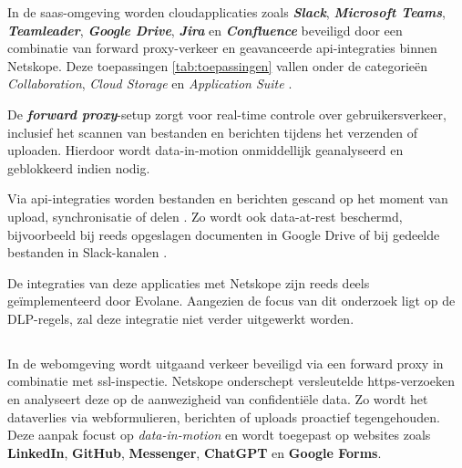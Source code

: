 
In de \gls{saas}-omgeving worden cloudapplicaties zoals \textbf{\textit{Slack}}, \textbf{\textit{Microsoft Teams}}, \textbf{\textit{Teamleader}}, 
\textbf{\textit{Google Drive}}, \textbf{\textit{Jira}} en \textbf{\textit{Confluence}} beveiligd door een combinatie van forward proxy-verkeer en geavanceerde \gls{api}-integraties binnen Netskope. 
Deze toepassingen \ref{tab:toepassingen} vallen onder de categorieën \textit{Collaboration}, \textit{Cloud Storage} en \textit{Application Suite} \autocite{Netskope2025API}.

De \textit{\textbf{forward proxy}}-setup zorgt voor real-time controle over gebruikersverkeer, 
inclusief het scannen van bestanden en berichten tijdens het verzenden of uploaden. 
Hierdoor wordt data-in-motion onmiddellijk geanalyseerd en geblokkeerd indien nodig.

Via \gls{api}-integraties worden bestanden en berichten gescand op het moment van upload, synchronisatie of delen \autocite{Netskope2025API}. 
Zo wordt ook data-at-rest beschermd, bijvoorbeeld bij reeds opgeslagen documenten in Google Drive of bij gedeelde bestanden in Slack-kanalen \autocite{Netskope2022Slack}.

De integraties van deze applicaties met Netskope zijn reeds deels geïmplementeerd door Evolane. 
Aangezien de focus van dit onderzoek ligt op de DLP-regels, zal deze integratie niet verder uitgewerkt worden.

\subsection{}
\label{subsubsec:web-poc}

In de webomgeving wordt uitgaand verkeer beveiligd via een forward proxy in combinatie met \gls{ssl}-inspectie. 
Netskope onderschept versleutelde \gls{https}-verzoeken en analyseert deze op de aanwezigheid van confidentiële data.
Zo wordt het dataverlies via webformulieren, berichten of uploads proactief tegengehouden. 
Deze aanpak focust op \textit{data-in-motion} en wordt toegepast op websites zoals \textbf{LinkedIn}, \textbf{GitHub}, \textbf{Messenger}, \textbf{ChatGPT} en \textbf{Google Forms}.

